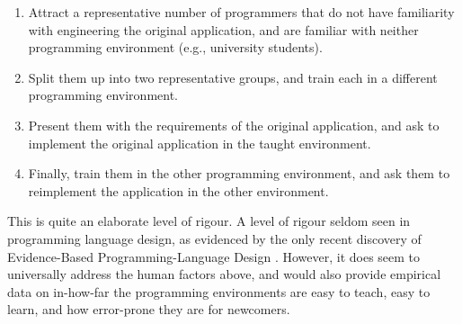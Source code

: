 \begin{enumerate}

\item Attract a representative number of programmers that do not have
familiarity with engineering the original application, and are
familiar with neither programming environment (e.g., university
students).

\item Split them up into two representative groups, and train each in
a different programming environment.

\item Present them with the requirements of the original application,
and ask to implement the original application in the taught
environment.

\item Finally, train them in the other programming environment, and
ask them to reimplement the application in the other environment.

\end{enumerate}

This is quite an elaborate level of rigour. A level of rigour seldom
seen in programming language design, as evidenced by the only recent
discovery of Evidence-Based Programming-Language Design
\cite{dagstuhl18061}. However, it does seem to universally address the
human factors above, and would also provide empirical data on
in-how-far the programming environments are easy to teach, easy to
learn, and how error-prone they are for newcomers.
